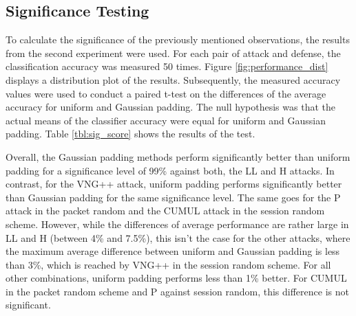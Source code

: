 \documentclass[
	ruledheaders=chapter,
	class=report,
	thesis={type=master, department=inf},
	accentcolor=1c,
	custommargins=true,
	marginpar=false,
	parskip=half-,
	fontsize=11pt,
]{tudapub}
\begin{document}
	\subsection{Significance Testing}
	\label{results:sig_score}
	
	To calculate the significance of the previously mentioned observations, the results from the second experiment were used. For each pair of attack and defense, the classification accuracy was measured 50 times. Figure \ref{fig:performance_dist} displays a distribution plot of the results. Subsequently, the measured accuracy values were used to conduct a paired t-test on the differences of the average accuracy for uniform and Gaussian padding. The null hypothesis was that the actual means of the classifier accuracy were equal for uniform and Gaussian padding. Table \ref{tbl:sig_score} shows the results of the test.
	
	Overall, the Gaussian padding methods perform significantly better than uniform padding for a significance level of 99\% against both, the LL and H attacks. In contrast, for the VNG++ attack, uniform padding performs significantly better than Gaussian padding for the same significance level. The same goes for the P attack in the packet random and the CUMUL attack in the session random scheme. However, while the differences of average performance are rather large in LL and H (between 4\% and 7.5\%), this isn't the case for the other attacks, where the maximum average difference between uniform and Gaussian padding is less than 3\%, which is reached by VNG++ in the session random scheme. For all other combinations, uniform padding performs less than 1\% better. For CUMUL in the packet random scheme and P against session random, this difference is not significant.
		
\end{document}
